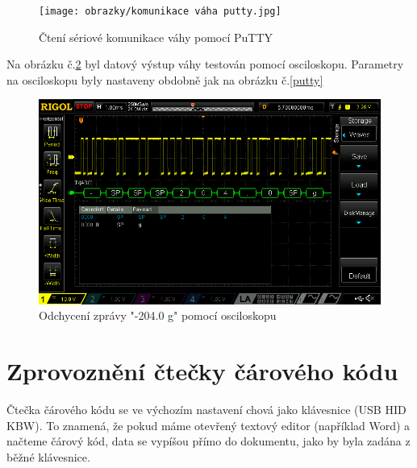 \begin{figure}[H]
    \begin{center}
        \texttt{[image: obrazky/komunikace váha putty.jpg]}
    \end{center}
    \caption{Čtení sériové komunikace váhy pomocí PuTTY}
    \label{puttyyyy}
\end{figure}

Na obrázku č.\ref{osc} byl datový výstup váhy testován pomocí osciloskopu. Parametry na osciloskopu byly nastaveny obdobně jak na obrázku č.\ref{putty}

\begin{figure}[H]
    \begin{center}
        \includegraphics[scale=0.5]{obrazky/DS1Z_QuickPrint6.png}
    \end{center}
    \caption{Odchycení zprávy "-204.0 g" pomocí osciloskopu}
    \label{osc}
\end{figure}

\section{Zprovoznění čtečky čárového kódu}
\label{zprovozeni_ctecky}

Čtečka čárového kódu se ve výchozím nastavení chová jako klávesnice (USB HID KBW). To znamená, že pokud máme otevřený textový editor (například Word) a načteme čárový kód, data se vypíšou přímo do dokumentu, jako by byla zadána z běžné klávesnice.

